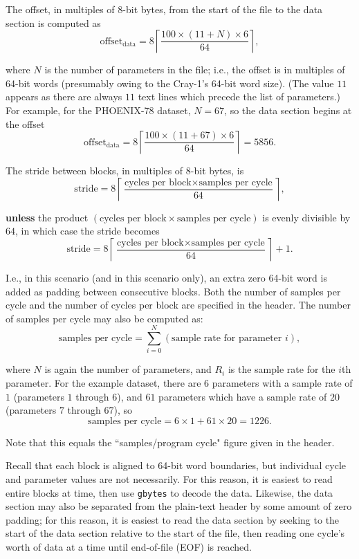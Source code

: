 \documentclass{report}
\begin{document}
The offset, in multiples of 8-bit bytes, from the start of the file to the data section is computed as
\[
	\text{offset}_\text{data} = 8 \left \lceil \dfrac{100\times(11+N)\times6}{64} \right \rceil \mathrm{,}
\]

\noindent where \(N\) is the number of parameters in the file; i.e., the offset is in multiples of 64-bit words (presumably owing to the Cray-1's 64-bit word size). (The value \(11\) appears as there are always \(11\) text lines which precede the list of parameters.) For example, for the PHOENIX-78 dataset, \(N = 67\), so the data section begins at the offset
\[
	\text{offset}_\text{data} = 8 \left \lceil \dfrac{100\times(11+67)\times 6}{64} \right \rceil = 5856 \mathrm{.}
\]

The stride between blocks, in multiples of 8-bit bytes, is
\[
	\text{stride} = 8 \left \lceil \dfrac{\text{cycles per block} \times \text{samples per cycle}}{64} \right \rceil \mathrm{,}
\]

\noindent \textbf{unless} the product \((\text{cycles per block} \times \text{samples per cycle})\) is evenly divisible by \(64\), in which case the stride becomes
\[
	\text{stride} = 8 \left \lceil \dfrac{\text{cycles per block} \times \text{samples per cycle}}{64} \right \rceil + 1 \mathrm{.}
\]

\noindent I.e., in this scenario (and in this scenario only), an extra zero 64-bit word is added as padding between consecutive blocks. Both the number of samples per cycle and the number of cycles per block are specified in the header. The number of samples per cycle may also be computed as:
\[
	\text{samples per cycle} = \sum_{i=0}^{N} (\text{sample rate for parameter }i) \mathrm{,}
\]

\noindent where \(N\) is again the number of parameters, and \(R_i\) is the sample rate for the \(i\)th parameter. For the example dataset, there are \(6\) parameters with a sample rate of \(1\) (parameters \(1\) through \(6\)), and \(61\) parameters which have a sample rate of \(20\) (parameters \(7\) through \(67\)), so
\[
	\text{samples per cycle} = 6 \times 1 + 61 \times 20 = 1226 \mathrm{.}
\]

\noindent Note that this equals the ``samples/program cycle" figure given in the header.

Recall that each block is aligned to 64-bit word boundaries, but individual cycle and parameter values are not necessarily. For this reason, it is easiest to read entire blocks at time, then use \texttt{gbytes} to decode the data. Likewise, the data section may also be separated from the plain-text header by some amount of zero padding; for this reason, it is easiest to read the data section by seeking to the start of the data section relative to the start of the file, then reading one cycle's worth of data at a time until end-of-file (EOF) is reached.
\end{document}
